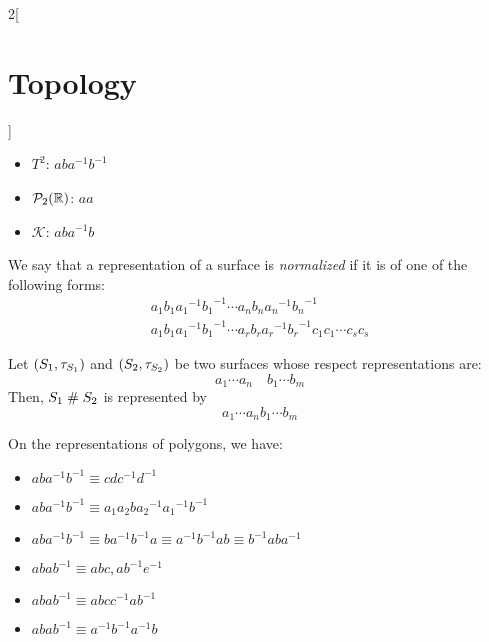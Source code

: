 \documentclass[../../../main.tex]{subfiles}
\begin{document}
\begin{multicols}{2}[\section{Topology}]
\begin{prop}
\begin{itemize}
      \item $T^2$: $aba^{-1}b^{-1}$
      \item $\mathcal{P}_2(\mathbb{R})$: $aa$
      \item $\mathcal{K}$: $aba^{-1}b$
    \end{itemize}
  \end{prop}
  \begin{center}
    \begin{minipage}{\linewidth}
      \centering
      
    \end{minipage}
  \end{center}
  \begin{definition}
    We say that a representation of a surface is \emph{normalized} if it is of one of the following forms:
    \begin{gather*}
      a_1b_1{a_1}^{-1}{b_1}^{-1}\cdots a_nb_n{a_n}^{-1}{b_n}^{-1}\\
      a_1b_1{a_1}^{-1}{b_1}^{-1}\cdots a_rb_r{a_r}^{-1}{b_r}^{-1}c_1c_1\cdots c_sc_s
    \end{gather*}
  \end{definition}
  \begin{prop}
    Let $(S_1,\tau_{S_1})$ and $(S_2,\tau_{S_2})$ be two surfaces whose respect representations are: $$a_1\cdots a_n\quad b_1\cdots b_m$$
    Then, $S_1\mathrel{\#} S_2$ is represented by $$a_1\cdots a_nb_1\cdots b_m$$
  \end{prop}
  \begin{prop}
    On the representations of polygons, we have:
    \begin{itemize}
      \item $aba^{-1}b^{-1}\equiv cdc^{-1}d^{-1}$
      \item $aba^{-1}b^{-1}\equiv a_1a_2b{a_2}^{-1}{a_1}^{-1}b^{-1}$
      \item $aba^{-1}b^{-1}\equiv ba^{-1}b^{-1}a\equiv a^{-1}b^{-1}ab\equiv b^{-1}aba^{-1}$
      \item $abab^{-1}\equiv abc, ab^{-1}e^{-1}$
      \item $abab^{-1}\equiv abcc^{-1}ab^{-1}$
      \item $abab^{-1}\equiv a^{-1}b^{-1}a^{-1}b$
    \end{itemize}
  \end{prop}
  \begin{corollary}

\end{corollary}
\end{multicols}
\end{document}
